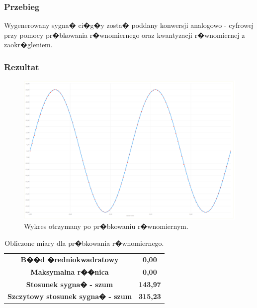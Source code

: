 \documentclass[12pt]{article}
\begin{document}
\subsubsection{Przebieg}
Wygenerowany sygna� ci�g�y zosta� poddany konwersji analogowo - cyfrowej przy pomocy pr�bkowania r�wnomiernego oraz kwantyzacji r�wnomiernej z zaokr�gleniem.

\subsubsection{Rezultat}

\begin{figure}[h!]
\includegraphics[scale=0.35]{w4.png}
\caption{Wykres otrzymany po pr�bkowaniu r�wnomiernym.}
\end{figure}


\begin{table}[h!]
\centering
\caption{Obliczone miary dla pr�bkowania r�wnomiernego.}
\begin{tabular}{c c}
\textbf{B��d �redniokwadratowy} & \textbf{0,00} \\
\textbf{Maksymalna r��nica} & \textbf{0,00} \\
\textbf{Stosunek sygna� - szum} & \textbf{143,97} \\
\textbf{Szczytowy stosunek sygna� - szum} & \textbf{315,23} \\
\end{tabular}
\end{table}
\end{document}
